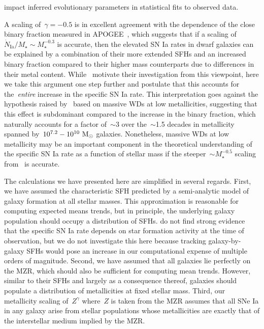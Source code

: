 \documentclass[ms.tex]{subfiles}
\begin{document}
impact inferred evolutionary parameters in statistical fits to observed data.
\par
A scaling of~$\gamma = -0.5$ is in excellent agreement with the dependence of
the close binary fraction measured in APOGEE~\citep{Moe2019}, which suggests
that if a scaling of~$\dot{N}_\text{Ia} / M_\star \sim M_\star^{-0.3}$ is
accurate, then the elevated SN Ia rates in dwarf galaxies can be explained by a
combination of their more extended SFHs and an increased binary fraction
compared to their higher mass counterparts due to differences in their metal
content.
While~\citet{Gandhi2022} motivate their investigation from this viewpoint, here
we take this argument one step further and postulate that this accounts for
the~\textit{entire} increase in the specific SN Ia rate.
This interpretation goes against the hypothesis raised by~\citet{Kistler2013}
based on massive WDs at low metallicities, suggesting that this effect is
subdominant compared to the increase in the binary fraction, which naturally
accounts for a factor of~$\sim$3 over the~$\sim$1.5 decades in metallicity
spanned by~$10^{7.2} - 10^{10}~\text{M}_\odot$ galaxies.
Nonetheless, massive WDs at low metallicity may be an important component in
the theoretical understanding of the specific SN Ia rate as a function of
stellar mass if the steeper~$\sim M_\star^{-0.5}$ scaling from~\citet{Brown2019}
is accurate.
\par
The calculations we have presented here are simplified in several regards.
First, we have assumed the characteristic SFH predicted by a semi-analytic
model of galaxy formation at all stellar masses.
This approximation is reasonable for computing expected means trends, but in
principle, the underlying galaxy population should occupy a distribution of
SFHs.
\citet{Brown2019} do not find strong evidence that the specific SN Ia rate
depends on star formation activity at the time of observation, but we do not
investigate this here because tracking galaxy-by-galaxy SFHs would pose an
increase in our computational expense of multiple orders of magnitude.
Second, we have assumed that all galaxies lie perfectly on the MZR, which
should also be sufficient for computing mean trends.
However, similar to their SFHs and largely as a consequence thereof, galaxies
should populate a distribution of metallicities at fixed stellar mass.
Third, our metallicity scaling of~$Z^\gamma$ where~$Z$ is taken from the
\citet{Zahid2014} MZR assumes that all SNe Ia in any galaxy arise from stellar
populations whose metallicities are exactly that of the interstellar
medium implied by the MZR.
\end{document}
